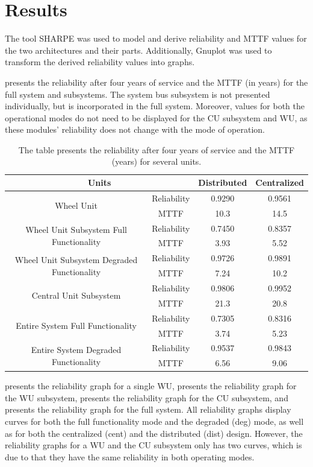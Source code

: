 \newpage
\section{Results}
\label{S4}
The tool SHARPE \cite{sharpe} was used to model and derive reliability and MTTF values for the two architectures and their parts. Additionally, Gnuplot \cite{gnuplot} was used to transform the derived reliability values into graphs.

 presents the reliability after four years of service and the MTTF (in years) for the full system and subsystems. The system bus subsystem is not presented individually, but is  incorporated in the full system. Moreover, values for both the operational modes do not need to be displayed for the CU subsystem and WU, as these modules' reliability does not change with the mode of operation.

\begin{table}[H]
\centering
\begin{tabular}{| c | c | c | c |}
\hline
\multicolumn{2}{|c|}{Units} & Distributed & Centralized\\
\hline
\multirow{2}{*}{Wheel Unit} & Reliability & 0.9290 & 0.9561\\
 & MTTF & 10.3  & 14.5\\
\hline
\multirow{2}{*}{Wheel Unit Subsystem Full Functionality} & Reliability & 0.7450 & 0.8357\\
 & MTTF & 3.93  & 5.52\\
\hline
\multirow{2}{*}{Wheel Unit Subsystem Degraded Functionality}& Reliability & 0.9726  & 0.9891\\
 & MTTF & 7.24 & 10.2\\
\hline
\multirow{2}{*}{Central Unit Subsystem}& Reliability& 0.9806  & 0.9952\\
 & MTTF & 21.3  & 20.8\\
\hline
\multirow{2}{*}{Entire System Full Functionality}& Reliability & 0.7305  & 0.8316\\
 & MTTF & 3.74 & 5.23\\
\hline
\multirow{2}{*}{Entire System Degraded Functionality}& Reliability & 0.9537 & 0.9843\\
 & MTTF & 6.56 & 9.06\\
\hline
\end{tabular}
\caption{The table presents the reliability after four years of service and the MTTF (years) for several units.}
\label{tab:res}
\end{table}
 presents the reliability graph for a single WU,  presents the reliability graph for the WU subsystem,  presents the reliability graph for the CU subsystem, and  presents the reliability graph for the full system. All reliability graphs display curves for both the full functionality mode and the degraded (deg) mode, as well as for both the centralized (cent) and the distributed (dist) design. However, the reliability graphs for a WU and the CU subsystem only has two curves, which is due to that they have the same reliability in both operating modes. 

